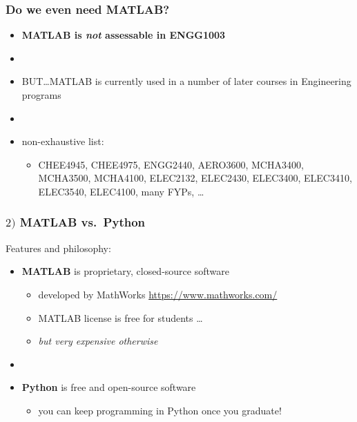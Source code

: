 \documentclass[english,14pt]{beamer}
\begin{document}

\begin{frame}[fragile]

\frametitle{Do we even need MATLAB?}

\begin{itemize}
	\item \textbf{MATLAB is \emph{not} assessable in ENGG1003}
	
	\item[]
	
	\item BUT\ldots MATLAB is currently used in a number of later courses in Engineering programs
	\item[]
	\item non-exhaustive list:
	\begin{itemize}
		\item[] CHEE4945, CHEE4975,  ENGG2440, AERO3600, MCHA3400, MCHA3500, MCHA4100, ELEC2132, ELEC2430, ELEC3400, ELEC3410, ELEC3540, ELEC4100, many FYPs, \ldots
	\end{itemize}

\end{itemize}
\end{frame}


\begin{frame}[fragile]

\frametitle{$2)$ MATLAB vs.~Python}

Features and philosophy:
\vspace*{7mm}

\begin{itemize}
	\item \textbf{MATLAB} is proprietary, closed-source software
	\begin{itemize}
		\item developed by MathWorks \href{https://www.mathworks.com/}{https://www.mathworks.com/}
		\item MATLAB license is free for students \ldots
		\item[] \emph{but very expensive otherwise}
	\end{itemize}
	\item[]
	\item \textbf{Python} is free and open-source software
	\begin{itemize}
		\item you can keep programming in Python once you graduate!
	\end{itemize}
\end{itemize}

\end{frame}
\end{document}
